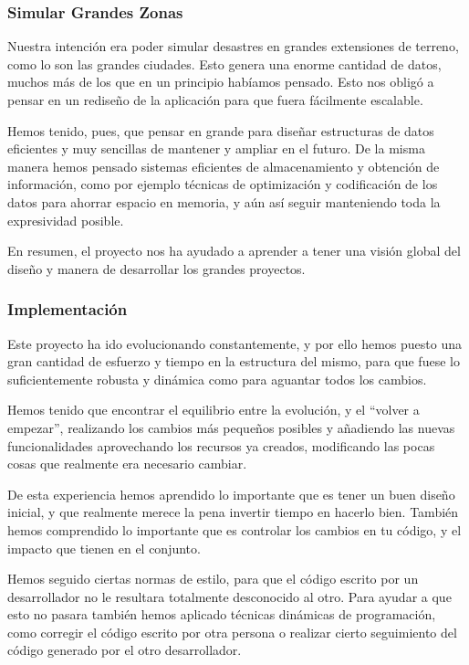 \subsubsection{Simular Grandes Zonas}

Nuestra intención era poder simular desastres en grandes extensiones de terreno,
como lo son las grandes ciudades. Esto genera una enorme cantidad de datos,
muchos más de los que en un principio habíamos pensado. Esto nos obligó a
pensar en un rediseño de la aplicación para que fuera fácilmente escalable.

Hemos tenido, pues, que pensar en grande para diseñar estructuras de datos
eficientes y muy sencillas de mantener y ampliar en el futuro. De la misma
manera hemos pensado sistemas eficientes de almacenamiento y obtención de
información, como por ejemplo técnicas de optimización y codificación de los
datos para ahorrar espacio en memoria, y aún así seguir manteniendo toda la
expresividad posible.

En resumen, el proyecto nos ha ayudado a aprender a tener una visión global del
diseño y manera de desarrollar los grandes proyectos.

\subsubsection{Implementación}

Este proyecto ha ido evolucionando constantemente, y por ello hemos puesto una
gran cantidad de esfuerzo y tiempo en la estructura del mismo, para que fuese lo
suficientemente robusta y dinámica como para aguantar todos los cambios.

Hemos tenido que encontrar el equilibrio entre la evolución, y el ``volver a
empezar'', realizando los cambios más pequeños posibles y añadiendo las
nuevas funcionalidades aprovechando los recursos ya creados, modificando las
pocas cosas que realmente era necesario cambiar.

De esta experiencia hemos aprendido lo importante que es tener un buen diseño
inicial, y que realmente merece la pena invertir tiempo en hacerlo bien.
También hemos comprendido lo importante que es controlar los cambios en tu
código, y el impacto que tienen en el conjunto.

Hemos seguido ciertas normas de estilo, para que el código escrito por un
desarrollador no le resultara totalmente desconocido al otro. Para ayudar a que
esto no pasara también hemos aplicado técnicas dinámicas de programación, como
corregir el código escrito por otra persona o realizar cierto seguimiento del
código generado por el otro desarrollador.

